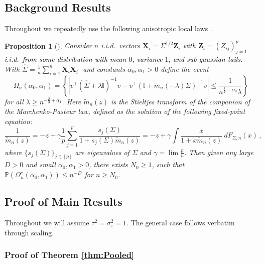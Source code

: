 \documentclass{article}
\theoremstyle{plain}
\newtheorem{proposition}[theorem]{Proposition}
\theoremstyle{remark}
\def \bX{\mathbf{X}}
\def \bX{\boldsymbol{X}}
\begin{document}
\subsection{Background Results} Throughout we repeatedly use the following anisotropic local laws \citep{knowles2017anisotropic}.
\begin{proposition}[\citep{knowles2017anisotropic}]\label{prop:prop_anisotropic_local_law}
Consider $n$ i.i.d.\ vectors $\bX_i = \Sigma^{1/2}\mathbf{Z}_i$ with $\mathbf{Z}_i=(Z_{ij})_{j=1}^p$ \textcolor{black}{i.i.d.\ from some distribution with mean $0$, variance $1$, and sub-gaussian tails}. With $\hat{\Sigma}=\frac{1}{n}\sum\limits_{i=1}^n \bX_i\bX_i^\top$ and constants $\alpha_0,\alpha_1>0$ define the event
    $$
    \Omega_n(\alpha_0,\alpha_1) = \left\{ \left| v^\top (\hat \Sigma + \lambda \mathbb{I})^{-1}v - v^\top \left(\mathbb{I} + \tilde m_n(-\lambda) \Sigma\right)^{-1}v \right| \le \frac{1}{n^{\frac12 - \alpha_0}\lambda}\right\}
    $$
    for all $\lambda \ge n^{-\frac23 + \alpha_1}$.
    Here $\tilde m_n(z)$ is the Stieltjes transform of the companion of the Marchenko-Pasteur law, defined as the solution of the following fixed-point equation: 
    \begin{equation}
    \label{eq:comp_MP}
    \frac{1}{\tilde m_n(z)} = - z + \gamma \frac1p\sum_{j = 1}^p \frac{s_j(\Sigma)}{1 + s_j(\Sigma)\tilde m_n(z)} = -z + \gamma \int \frac{x}{1 + x \tilde m_n(z)} \ dF_{\Sigma, n}(x) \,,
    \end{equation}
    where $\{s_j(\Sigma)\}_{j \in [p]}$ are eigenvalues of $\Sigma$ and $\gamma=\lim \frac{p}{n}$. 
    Then given any large $D > 0$ and small $\alpha_0, \alpha_1 > 0$, there exists $N_0 \geq 1$, such that $\mathbb{P}(\Omega_n^c(\alpha_0,\alpha_1)) \le n^{-D}$ for $n \ge N_0$.
\end{proposition}

\subsection{Proof of Main Results} Throughout we will assume $\tau^2=\sigma_{\varepsilon}^2=1$. The general case follows verbatim through scaling.
\subsubsection{Proof of Theorem \ref{thm:Pooled}}
\end{document}
